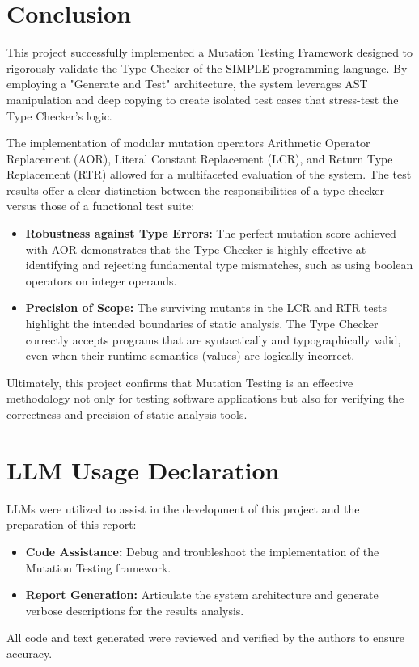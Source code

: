 \documentclass[titlepage]{article}
\begin{document}
\section{Conclusion}

This project successfully implemented a Mutation Testing Framework designed to rigorously validate the Type Checker of the SIMPLE programming language. By employing a "Generate and Test" architecture, the system leverages AST manipulation and deep copying to create isolated test cases that stress-test the Type Checker's logic.

The implementation of modular mutation operators Arithmetic Operator Replacement (AOR), Literal Constant Replacement (LCR), and Return Type Replacement (RTR) allowed for a multifaceted evaluation of the system. The test results offer a clear distinction between the responsibilities of a type checker versus those of a functional test suite:

\begin{itemize}
    \item \textbf{ Robustness against Type Errors:} The perfect mutation score achieved with AOR demonstrates that the Type Checker is highly effective at identifying and rejecting fundamental type mismatches, such as using boolean operators on integer operands.
    \item \textbf{ Precision of Scope:} The surviving mutants in the LCR and RTR tests highlight the intended boundaries of static analysis. The Type Checker correctly accepts programs that are syntactically and typographically valid, even when their runtime semantics (values) are logically incorrect.
\end{itemize}

Ultimately, this project confirms that Mutation Testing is an effective methodology not only for testing software applications but also for verifying the correctness and precision of static analysis tools.

\section{LLM Usage Declaration}

LLMs were utilized to assist in the development of this project and the preparation of this report:
\begin{itemize}
    \item \textbf{Code Assistance:} Debug and troubleshoot the implementation of the Mutation Testing framework.
    \item \textbf{Report Generation:} Articulate the system architecture and generate verbose descriptions for the results analysis.
\end{itemize}
All code and text generated were reviewed and verified by the authors to ensure accuracy.
\end{document}
